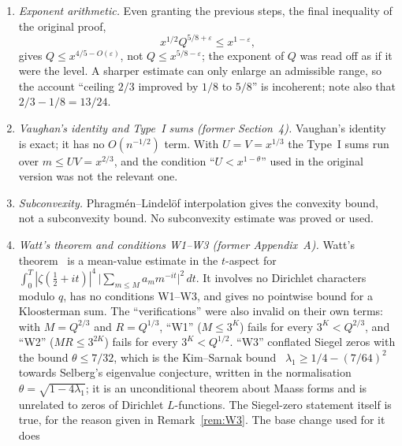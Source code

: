 \documentclass[12pt]{amsart}
\theoremstyle{plain}
\theoremstyle{definition}
\begin{document}
\begin{enumerate}[label=(\arabic*),ref=(\arabic*)]
    $\sum_{3^K \leq Q}|S(a,b;3^K)| \ll Q^{5/8+\varepsilon}$ is true, but it is
    weaker than what the general bound gives for fixed $(a,b) \neq (0,0)$
    (namely $\ll_{a,b} Q^{1/2+\varepsilon}$), so it is no improvement.
    Watt's theorem, invoked for the pointwise bound, does not give it
    (item~\ref{wd:watt}).
  \item \emph{Exponent arithmetic.} Even granting the previous steps, the
    final inequality of the original proof,
    \[
      x^{1/2}Q^{5/8+\varepsilon} \leq x^{1-\varepsilon},
    \]
    gives $Q \leq x^{4/5 - O(\varepsilon)}$, not $Q \leq x^{5/8-\varepsilon}$; the
    exponent of $Q$ was read off as if it were the level. A sharper estimate
    can only enlarge an admissible range, so the account ``ceiling $2/3$
    improved by $1/8$ to $5/8$'' is incoherent; note also that
    $2/3 - 1/8 = 13/24$.
  \item \emph{Vaughan's identity and Type~I sums (former Section~4).}
    Vaughan's identity~\cite{Vaughan1980} is exact; it has no $O(n^{-1/2})$
    term. With $U = V = x^{1/3}$ the Type~I sums run over $m \leq UV = x^{2/3}$,
    and the condition ``$U < x^{1-\theta}$'' used in the original version was
    not the relevant one.
  \item \emph{Subconvexity.} Phragm\'en--Lindel\"of interpolation gives the
    convexity bound, not a subconvexity bound. No subconvexity estimate was
    proved or used.
  \item \label{wd:watt} \emph{Watt's theorem and conditions W1--W3 (former
    Appendix~A).} Watt's theorem~\cite{Watt1995} is a mean-value estimate in
    the $t$-aspect for
    $\int_0^T |\zeta(\tfrac12+it)|^4\,\bigl|\sum_{m\leq M} a_m m^{-it}\bigr|^2\,dt$.
    It involves no Dirichlet characters modulo $q$, has no conditions
    W1--W3, and gives no pointwise bound for a Kloosterman sum. The
    ``verifications'' were also invalid on their own terms: with
    $M = Q^{2/3}$ and $R = Q^{1/3}$, ``W1'' ($M \leq 3^K$) fails for every
    $3^K < Q^{2/3}$, and ``W2'' ($MR \leq 3^{2K}$) fails for every
    $3^K < Q^{1/2}$. ``W3'' conflated Siegel zeros with the bound
    $\theta \leq 7/32$, which is the Kim--Sarnak bound~\cite{KimSarnak2003}
    $\lambda_1 \geq 1/4 - (7/64)^2$ towards Selberg's eigenvalue conjecture,
    written in the normalisation $\theta = \sqrt{1 - 4\lambda_1}$; it is an
    unconditional theorem about Maass forms and is unrelated to zeros of
    Dirichlet $L$-functions. The Siegel-zero statement itself is true, for the
    reason given in Remark~\ref{rem:W3}. The base change used for it does

\end{enumerate}
\end{document}
